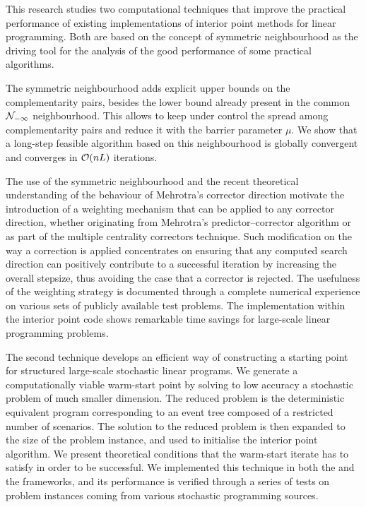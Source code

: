 
%
%

This research studies two computational techniques that improve
the practical performance of existing implementations 
of interior point methods for linear programming.
Both are based on the concept of symmetric neighbourhood 
as the driving tool for the analysis of the good 
performance of some practical algorithms. 

The symmetric neighbourhood adds explicit upper bounds
on the complementarity pairs, besides the lower bound already
present in the common $\mathcal{N}_{-\infty}$ neighbourhood.
This allows to keep under control the spread among 
complementarity pairs and reduce it with the barrier parameter $\mu$.
We show that a long-step feasible algorithm based on 
this neighbourhood is globally convergent and
converges in $\mathcal{O}(nL)$ iterations.

The use of the symmetric neighbourhood and the recent
theoretical understanding of the behaviour of Mehrotra's
corrector direction motivate the introduction of a weighting
mechanism that can be applied to any corrector direction,
whether originating from Mehrotra's predictor--corrector algorithm
or as part of the multiple centrality correctors technique.
Such modification on the way a correction is applied
concentrates on ensuring that any computed search direction can positively
contribute to a successful iteration by increasing the overall
stepsize, thus avoiding the case that a corrector is rejected.
The usefulness of the weighting strategy is documented through
a complete numerical experience on various sets of publicly
available test problems.
The implementation within the \HOPDM interior point code
shows remarkable time savings for large-scale linear programming problems.

The second technique develops an efficient way of 
constructing a starting point for structured large-scale 
stochastic linear programs.
We generate a computationally viable warm-start point by solving 
to low accuracy a stochastic problem of much smaller dimension.
The reduced problem is the deterministic equivalent program
corresponding to an event tree composed of a restricted number
of scenarios.
The solution to the reduced problem is then expanded to the
size of the problem instance, and used to initialise the
interior point algorithm.
We present theoretical conditions that the warm-start iterate
has to satisfy in order to be successful.
We implemented this technique in both the \HOPDM and the \OOPS
frameworks, and its performance is verified through 
a series of tests on problem instances coming from various stochastic
programming sources.
